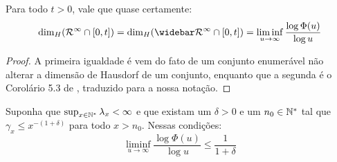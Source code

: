 \begin{teorema}
  Para todo $t > 0$, vale que quase certamente:
  \begin{displaymath}
    \dim_H(\RR^\infty \cap [0, t]) = 
    \dim_H(\RRb^\infty \cap [0, t]) =
    \liminf_{u \to \infty} \frac{\log \Phi(u)}{\log u}
  \end{displaymath}
\end{teorema}
\begin{proof}
  A primeira igualdade é vem do fato de um conjunto enumerável não
  alterar a dimensão de Hausdorf de um conjunto, enquanto que a
  segunda é o Corolário 5.3 de \cite{bertoin:97}, traduzido para a
  nossa notação.
\end{proof}

\begin{proposicao}
  Suponha que $\sup_{x\in{\mathbb{N^*}}}\lambda_x < \infty$ e que existam um
  $\delta>0$ e um $n_0 \in {\mathbb{N^*}}$ tal que $\gamma_x \leq x^{-(1+\delta)}$
  para todo $x > n_0$. Nessas condições:
  \begin{equation}
    \liminf_{u \to \infty} \frac{\log \Phi(u)}{\log u}  \leq \frac{1}{1+\delta}
  \end{equation}
\end{proposicao}

